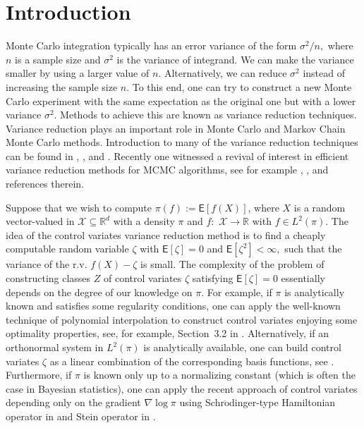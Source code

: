 \documentclass[bj]{imsart}
\begin{document}
\section{Introduction}

Monte Carlo integration typically has an error variance of the form
$\sigma^{2}/n,$ where $n$ is a sample size and \(\sigma^2\) is the variance of  integrand. We can make the variance smaller
by using a larger value of $n$.  Alternatively,
 we can  reduce $\sigma^2$ instead of increasing the sample size \(n\). To this end, one can try to construct
a new Monte Carlo experiment with the same expectation as the original one
but with a lower variance $\sigma^2$. Methods to achieve this are known as variance
reduction techniques. Variance reduction plays an important role in
Monte Carlo and Markov Chain Monte Carlo methods. Introduction to many of the variance reduction techniques can be found in \cite{christian1999monte}, \cite{rubinstein2016simulation}, \cite{GobetBook} and \cite{glasserman2013monte}. Recently one witnessed a revival of interest in efficient variance reduction methods  for MCMC algorithms, see for example \cite{dellaportas2012control}, \cite{mira2013zero}, \cite{brosse2018diffusion} and references therein.
\par
Suppose that we wish to compute $\pi(f):=\mathsf{E}\left[f(X)\right]$, where $X$
is a random vector-valued in $\mathcal{X}\subseteq\mathbb{R}^{d}$ with a density $\pi$ and $f:$
$\mathcal{X}\to\mathbb{R}$ with $f\in L^2(\pi)$.
The idea of the control variates variance reduction method
 is to find a cheaply computable random variable $\zeta$ with $\mathsf{E}[\zeta]=0$ and \(\mathsf{E}[\zeta^2]<\infty,\)
such that the variance of the r.v. $f(X)-\zeta$ is small.  The complexity of the problem of constructing classes $Z$ of control variates \(\zeta\) satisfying   $\mathsf{E}[\zeta]=0$ essentially depends on the degree of our knowledge on \(\pi.\)
For example, if \(\pi\) is analytically known and satisfies some regularity conditions, one can apply the well-known technique of  polynomial interpolation to construct control variates enjoying  some optimality properties, see, for example, Section~3.2 in \cite{dimov2008monte}. Alternatively, if an orthonormal system in \(L^2(\pi)\) is analytically available, one can build control variates \(\zeta\) as a linear combination of the corresponding basis functions, see \cite{GobetCV}. Furthermore, if \(\pi\) is known only up to a normalizing constant (which is often the case in Bayesian statistics), one can apply the recent approach of control variates  depending only on the gradient \(\nabla \log \pi\)  using Schr\(\ddot{\text{o}}\)dinger-type Hamiltonian operator in  \cite{mira2013zero} and Stein operator in \cite{brosse2018diffusion}.
\end{document}
